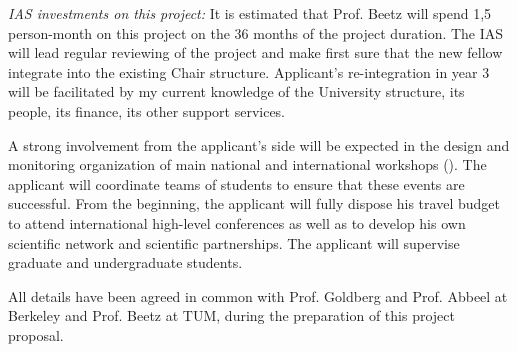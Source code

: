 \emph{IAS investments on this project:}
It is estimated  that Prof. Beetz will spend  1,5 person-month on this
project on the 36 months of  the project duration. The IAS will lead
regular  reviewing of the  project and  make first  sure that  the new
fellow integrate into the existing Chair structure. Applicant's re-integration
in  year  3  will  be  facilitated  by my  current  knowledge  of  the
University  structure,  its people,  its  finance,  its other  support
services.


A strong involvement from the applicant's side will be expected in the design
and  monitoring  organization   of  main  national  and  international
workshops  (). The applicant  will  coordinate  teams of
students  to  ensure  that  these  events are  successful.   From  the
beginning,  the applicant will fully  dispose his  travel budget  to attend
international  high-level conferences  as well  as to  develop  his own
scientific  network  and scientific  partnerships.   The applicant will  supervise
graduate and undergraduate students.

All details  have been agreed in  common with Prof. Goldberg and Prof. Abbeel  
at Berkeley and Prof. Beetz at TUM, during the preparation of this project proposal.


